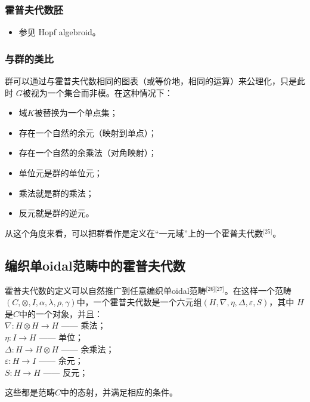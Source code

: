 \subsubsection{霍普夫代数胚}
\begin{itemize}
\item 参见 Hopf algebroid。
\end{itemize}
\subsubsection{与群的类比}
群可以通过与霍普夫代数相同的图表（或等价地，相同的运算）来公理化，只是此时 $G$被视为一个集合而非模。在这种情况下：
\begin{itemize}
\item 域$K$被替换为一个单点集；
\item 存在一个自然的余元（映射到单点）；
\item 存在一个自然的余乘法（对角映射）；
\item 单位元是群的单位元；
\item 乘法就是群的乘法；
\item 反元就是群的逆元。
\end{itemize}
从这个角度来看，可以把群看作是定义在“一元域”上的一个霍普夫代数\(^\text{[25]}\)。
\subsection{编织单oidal范畴中的霍普夫代数}
霍普夫代数的定义可以自然推广到任意编织单oidal范畴\(^\text{[26][27]}\)。在这样一个范畴$(C, \otimes, I, \alpha, \lambda, \rho, \gamma)$中，一个霍普夫代数是一个六元组$(H, \nabla, \eta, \Delta, \varepsilon, S)$，其中 $H$是$C$中的一个对象，并且：\\
$\nabla : H \otimes H \to H$ —— 乘法；\\
$\eta : I \to H$ —— 单位；\\
$\Delta : H \to H \otimes H$ —— 余乘法；\\
$\varepsilon : H \to I$ —— 余元；\\
$S : H \to H$ —— 反元；

这些都是范畴$C$中的态射，并满足相应的条件。

